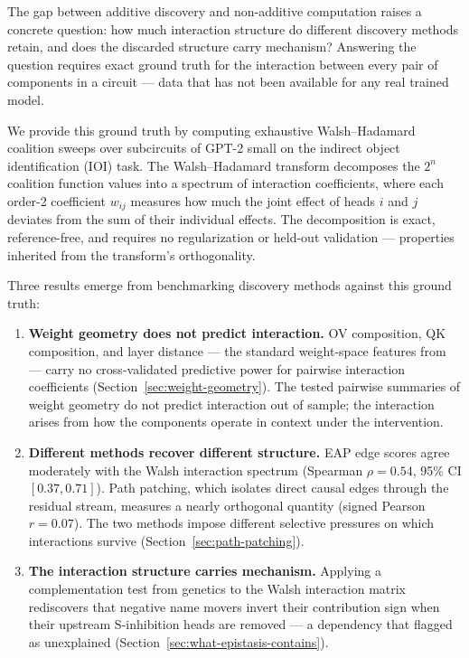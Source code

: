 \documentclass{article}
\begin{document}
The gap between additive discovery and non-additive computation raises a
concrete question: how much interaction structure do different discovery
methods retain, and does the discarded structure carry mechanism? Answering
the question requires exact ground truth for the interaction between every pair
of components in a circuit --- data that has not been
available for any real trained model.

We provide this ground truth by computing exhaustive Walsh--Hadamard
coalition sweeps over subcircuits of GPT-2 small on the indirect object
identification (IOI) task. The Walsh--Hadamard transform decomposes the
$2^n$ coalition function values into a spectrum of interaction
coefficients, where each order-2 coefficient $w_{ij}$ measures how much
the joint effect of heads $i$ and $j$ deviates from the sum of their
individual effects. The decomposition is exact, reference-free, and
requires no regularization or held-out validation --- properties
inherited from the transform's orthogonality.

Three results emerge from benchmarking discovery methods against this
ground truth:

\begin{enumerate}
\item \textbf{Weight geometry does not predict interaction.} OV composition, QK
  composition, and layer distance --- the standard weight-space features
  from \citet{elhage2021mathematical} --- carry no cross-validated
  predictive power for pairwise interaction coefficients
  (Section~\ref{sec:weight-geometry}). The tested pairwise summaries of weight geometry do not predict interaction out of sample; the interaction arises from how the components operate in context under the intervention.

\item \textbf{Different methods recover different structure.} EAP edge scores agree moderately with the Walsh interaction spectrum (Spearman $\rho = 0.54$, 95\% CI $[0.37, 0.71]$). Path patching, which isolates direct causal edges through
  the residual stream, measures a nearly orthogonal quantity (signed
  Pearson $r = 0.07$). The two methods impose different selective
  pressures on which interactions survive
  (Section~\ref{sec:path-patching}).

\item \textbf{The interaction structure carries mechanism.} Applying a
  complementation test from genetics to the Walsh interaction matrix
  rediscovers that negative name movers invert their contribution sign
  when their upstream S-inhibition heads are removed --- a dependency that \citet{wang2022ioi} flagged as unexplained
  (Section~\ref{sec:what-epistasis-contains}).
\end{enumerate}
\end{document}
